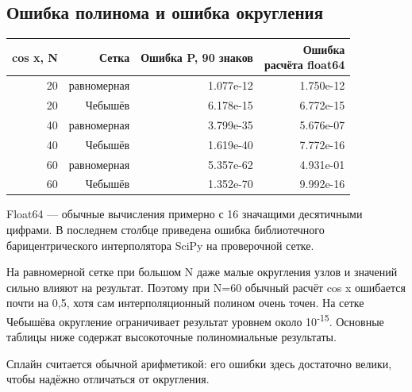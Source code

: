 \documentclass[12pt,a4paper]{article}
\begin{document}
\subsection{Ошибка полинома и ошибка округления}
\begin{center}\small\setlength{\tabcolsep}{5pt}\renewcommand{\arraystretch}{1.18}
\begin{tabular}{rrrr}\toprule
cos x, N & Сетка & Ошибка P, 90 знаков & \shortstack{Ошибка\\расчёта float64}\\ \midrule
20 & равномерная & 1.077e-12 & 1.750e-12\\
20 & Чебышёв & 6.178e-15 & 6.772e-15\\
40 & равномерная & 3.799e-35 & 5.676e-07\\
40 & Чебышёв & 1.619e-40 & 7.772e-16\\
60 & равномерная & 5.357e-62 & 4.931e-01\\
60 & Чебышёв & 1.352e-70 & 9.992e-16\\
\bottomrule\end{tabular}\end{center}
Float64 — обычные вычисления примерно с 16 значащими десятичными цифрами. В последнем столбце приведена ошибка библиотечного барицентрического интерполятора SciPy на проверочной сетке.

На равномерной сетке при большом N даже малые округления узлов и значений сильно влияют на результат. Поэтому при N=60 обычный расчёт cos x ошибается почти на 0,5, хотя сам интерполяционный полином очень точен. На сетке Чебышёва округление ограничивает результат уровнем около 10\textsuperscript{-15}. Основные таблицы ниже содержат высокоточные полиномиальные результаты.

Сплайн считается обычной арифметикой: его ошибки здесь достаточно велики, чтобы надёжно отличаться от округления.

\clearpage
\end{document}
